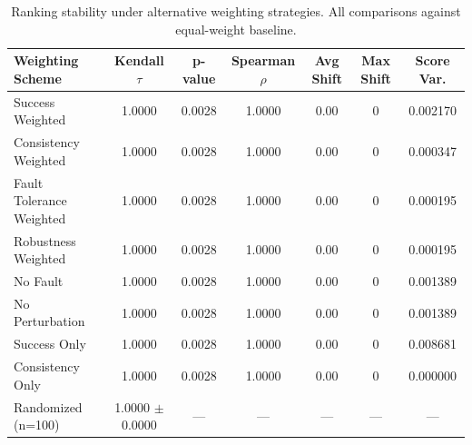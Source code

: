 \begin{table}[t]
\centering
\caption{Ranking stability under alternative weighting strategies. All comparisons against equal-weight baseline.}
\label{tab:weighting}
\begin{tabular}{lcccccc}
\toprule
Weighting Scheme & Kendall $\tau$ & p-value & Spearman $\rho$ & Avg Shift & Max Shift & Score Var. \\
\midrule
Success Weighted & 1.0000 & 0.0028 & 1.0000 & 0.00 & 0 & 0.002170 \\
Consistency Weighted & 1.0000 & 0.0028 & 1.0000 & 0.00 & 0 & 0.000347 \\
Fault Tolerance Weighted & 1.0000 & 0.0028 & 1.0000 & 0.00 & 0 & 0.000195 \\
Robustness Weighted & 1.0000 & 0.0028 & 1.0000 & 0.00 & 0 & 0.000195 \\
No Fault & 1.0000 & 0.0028 & 1.0000 & 0.00 & 0 & 0.001389 \\
No Perturbation & 1.0000 & 0.0028 & 1.0000 & 0.00 & 0 & 0.001389 \\
Success Only & 1.0000 & 0.0028 & 1.0000 & 0.00 & 0 & 0.008681 \\
Consistency Only & 1.0000 & 0.0028 & 1.0000 & 0.00 & 0 & 0.000000 \\
Randomized (n=100) & 1.0000 $\pm$ 0.0000 & --- & --- & --- & --- & --- \\
\bottomrule
\end{tabular}
\end{table}
